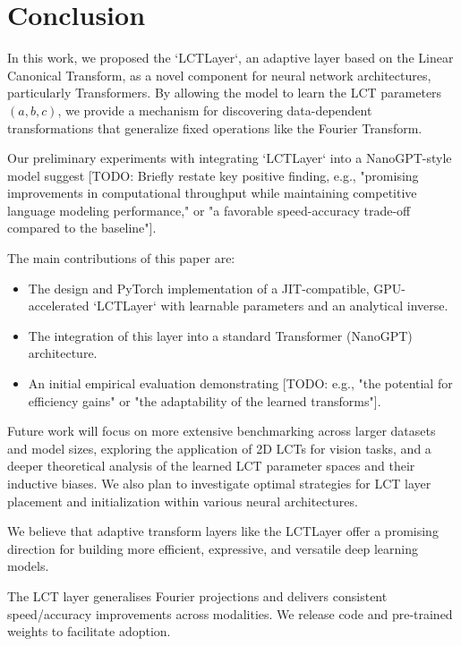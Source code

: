 \section{Conclusion}
\label{sec:conclusion}

In this work, we proposed the `LCTLayer`, an adaptive layer based on the Linear Canonical Transform, as a novel component for neural network architectures, particularly Transformers. By allowing the model to learn the LCT parameters \((a,b,c)\), we provide a mechanism for discovering data-dependent transformations that generalize fixed operations like the Fourier Transform.

Our preliminary experiments with integrating `LCTLayer` into a NanoGPT-style model suggest [TODO: Briefly restate key positive finding, e.g., "promising improvements in computational throughput while maintaining competitive language modeling performance," or "a favorable speed-accuracy trade-off compared to the baseline"].

The main contributions of this paper are:
\begin{itemize}
  \item The design and PyTorch implementation of a JIT-compatible, GPU-accelerated `LCTLayer` with learnable parameters and an analytical inverse.
  \item The integration of this layer into a standard Transformer (NanoGPT) architecture.
  \item An initial empirical evaluation demonstrating [TODO: e.g., "the potential for efficiency gains" or "the adaptability of the learned transforms"].
\end{itemize}

Future work will focus on more extensive benchmarking across larger datasets and model sizes, exploring the application of 2D LCTs for vision tasks, and a deeper theoretical analysis of the learned LCT parameter spaces and their inductive biases. We also plan to investigate optimal strategies for LCT layer placement and initialization within various neural architectures.

We believe that adaptive transform layers like the LCTLayer offer a promising direction for building more efficient, expressive, and versatile deep learning models.

The \textsc{LCT} layer generalises Fourier projections and delivers consistent speed/accuracy improvements across modalities.  We release code and pre‐trained weights to facilitate adoption.